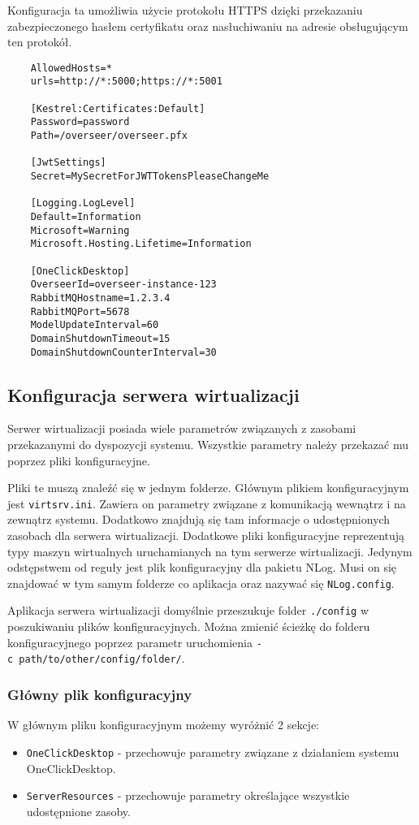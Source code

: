 \documentclass[../opis-rozwiazania.tex]{subfiles}
\begin{document}
Konfiguracja ta umożliwia użycie protokołu HTTPS dzięki przekazaniu zabezpieczonego hasłem certyfikatu oraz nasłuchiwaniu na adresie obsługującym ten protokół.

\begin{verbatim}
	AllowedHosts=*
	urls=http://*:5000;https://*:5001

	[Kestrel:Certificates:Default]
	Password=password
	Path=/overseer/overseer.pfx

	[JwtSettings]
	Secret=MySecretForJWTTokensPleaseChangeMe

	[Logging.LogLevel]
	Default=Information
	Microsoft=Warning
	Microsoft.Hosting.Lifetime=Information

	[OneClickDesktop]
	OverseerId=overseer-instance-123
	RabbitMQHostname=1.2.3.4
	RabbitMQPort=5678
	ModelUpdateInterval=60
	DomainShutdownTimeout=15
	DomainShutdownCounterInterval=30
\end{verbatim}

\subsection{Konfiguracja serwera wirtualizacji}
\label{system_startup.virtsrv_conf}
Serwer wirtualizacji posiada wiele parametrów związanych z zasobami przekazanymi do dyspozycji systemu.
Wszystkie parametry należy przekazać mu poprzez pliki konfiguracyjne.

Pliki te muszą znaleźć się w jednym folderze.
Głównym plikiem konfiguracyjnym jest \texttt{virtsrv.ini}.
Zawiera on parametry związane z komunikacją wewnątrz i na zewnątrz systemu.
Dodatkowo znajdują się tam informacje o udostępnionych zasobach dla serwera wirtualizacji.
Dodatkowe pliki konfiguracyjne reprezentują typy maszyn wirtualnych uruchamianych na tym serwerze wirtualizacji.
Jedynym odstępstwem od reguły jest plik konfiguracyjny dla pakietu NLog.
Musi on się znajdować w tym samym folderze co aplikacja oraz nazywać się \texttt{NLog.config}.

Aplikacja serwera wirtualizacji domyślnie przeszukuje folder \texttt{./config} w poszukiwaniu plików konfiguracyjnych.
Można zmienić ścieżkę do folderu konfiguracyjnego poprzez parametr uruchomienia \texttt{-c\ path/to/other/config/folder/}.

\subsubsection{Główny plik konfiguracyjny}
W głównym pliku konfiguracyjnym możemy wyróżnić 2 sekcje:
\begin{itemize}
  \item \texttt{OneClickDesktop} - przechowuje parametry związane z działaniem systemu OneClickDesktop.
  \item \texttt{ServerResources} - przechowuje parametry określające wszystkie udostępnione zasoby.
\end{itemize}
\end{document}
